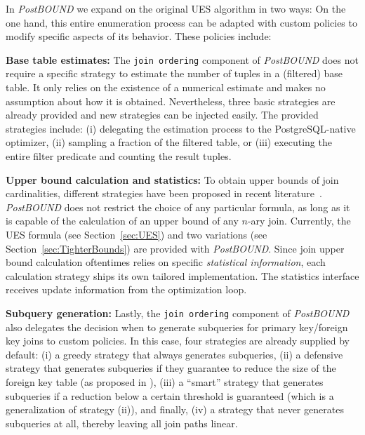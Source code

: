 In \emph{PostBOUND} we expand on the original UES algorithm in two ways: On the one hand, this entire enumeration process can be adapted with custom policies to modify specific aspects of its behavior. These policies include:

\begin{compactitem}
    \item[\textbf{Base table estimates:}] The \texttt{join ordering} component of \emph{PostBOUND} does not require a specific strategy to estimate the number of tuples in a (filtered) base table. It only relies on the existence of a numerical estimate and makes no assumption about how it is obtained. Nevertheless, three basic strategies are already provided and new strategies can be injected easily. The provided strategies include: (i) delegating the estimation process to the PostgreSQL-native optimizer, (ii) sampling a fraction of the filtered table, or (iii) executing the entire filter predicate and counting the result tuples.
    \item[\textbf{Upper bound calculation and statistics:}] To obtain upper bounds of join cardinalities, different strategies have been proposed in recent literature~\cite{DBLP:conf/sigmod/CaiBS19,DBLP:journals/corr/abs-2201-04166,hertzschuch-21-ues}. \emph{PostBOUND} does not restrict the choice of any particular formula, as long as it is capable of the calculation of an upper bound of any $n$-ary join. Currently, the UES formula (see Section~\ref{sec:UES}) and two variations (see Section~\ref{sec:TighterBounds}) are provided with \emph{PostBOUND}. Since join upper bound calculation oftentimes relies on specific \emph{statistical information}, each calculation strategy ships its own tailored implementation. The statistics interface receives update information from the optimization loop.
    \item[\textbf{Subquery generation:}] \label{item:postbound-subqueries} Lastly, the \texttt{join ordering} component of \emph{PostBOUND} also delegates the decision when to generate subqueries for primary key/foreign key joins to custom policies. In this case, four strategies are already supplied by default: (i) a greedy strategy that always generates subqueries, (ii) a defensive strategy that generates subqueries if they guarantee to reduce the size of the foreign key table (as proposed in \cite{hertzschuch-21-ues}), (iii) a ``smart'' strategy that generates subqueries if a reduction below a certain threshold is guaranteed (which is a generalization of strategy (ii)), and finally, (iv) a strategy that never generates subqueries at all, thereby leaving all join paths linear.
\end{compactitem}

